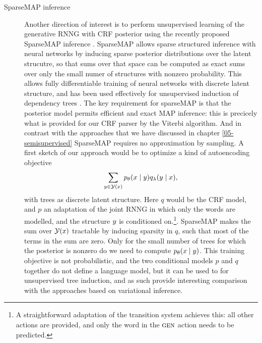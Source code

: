 \begin{description}
    \item[SparseMAP inference]
      Another direction of interest is to perform unsupervised learning of the generative RNNG with CRF posterior using the recently proposed SparseMAP inference \citep{niculae2018sparsemap}. SparseMAP allows sparse structured inference with neural networks by inducing sparse posterior distributions over the latent strucutre, so that sums over that space can be computed as exact sums over only the small numer of structures with nonzero probability. This allows fully differentiable training of neural networks with discrete latent structure, and has been used effectively for unsupervised induction of dependency trees \citep{niculae2018towards}. The key requirement for sparseMAP is that the posterior model permits efficient and exact MAP inference: this is precicely what is provided for our CRF parser by the Viterbi algorithm. And in contrast with the approaches that we have discussed in chapter \ref{05-semisupervised} SparseMAP requires no approximation by sampling. A first sketch of our approach would be to optimize a kind of autoencoding objective
      \begin{align*}
        \sum_{ y \in \mathcal{Y}(x) } p_{\theta}(x \mid y) q_{\lambda}( y \mid x ),
      \end{align*}
      with trees as discrete latent structure. Here $q$ would be the CRF model, and $p$ an adaptation of the joint RNNG in which only the words are modelled, and the structure $y$ is conditioned on.\footnote{A straightforward adaptation of the transition system achieves this: all other actions are provided, and only the word in the $\textsc{gen}$ action needs to be predicted.}. SparseMAP makes the sum over $\mathcal{Y}(x)$ tractable by inducing sparsity in $q$, such that most of the terms in the sum are zero. Only for the small number of trees for which the posterior is nonzero do we need to compute $p_{\theta}(x \mid y)$. This training objective is not probabilistic, and the two conditional models $p$ and $q$ together do not define a language model, but it can be used to for unsupervised tree induction, and as such provide interesting comparison with the approaches based on variational inference.

    \end{description}
